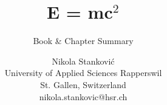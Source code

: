 \documentclass[a4paper,12pt]{scrreprt}
\newcommand{\autoren}{Nikola Stanković}
\newcommand{\dokumenttitel}{E = mc$^2$}
\newcommand{\dokumentuntertitel}{Book \& Chapter Summary}
\begin{document}
\author{\autoren \\ University of Applied Sciences Rapperswil \\ St. Gallen, Switzerland \\ nikola.stankovic@hsr.ch}

\title{\dokumenttitel}
\subtitle{\dokumentuntertitel}
\maketitle
\tableofcontents








\end{document}
